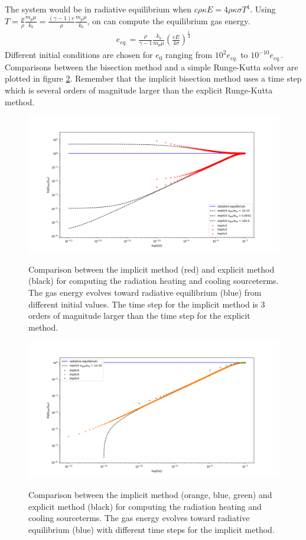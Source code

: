 The system would be in radiative equilibrium when $c \rho \kappa E = 4 \rho \kappa \sigma T^4$. Using $T =  \frac{p}{\rho} \frac{m_p \mu}{k_b}= \frac{(\gamma - 1)e}{\rho} \frac{m_p \mu}{k_b}$, on can compute the equilibrium gas energy.
\begin{align}
e_{eq.} = \frac{\rho}{\gamma - 1} \frac{k_b}{m_p \mu}\left( \frac{c E}{4 \sigma} \right)^\frac{1}{4}
\end{align}
Different initial conditions are chosen for $e_0$ ranging from $10^2 e_{eq.}$ to $10^{-10} e_{eq.}$. Comparisons between the bisection method and a simple Runge-Kutta solver are plotted in figure \ref{fig: test_sourceterms}. Remember that the implicit bisection method uses a time step which is several orders of magnitude larger than the explicit Runge-Kutta method.

\begin{figure}
\includegraphics[width = \textwidth]{test_sourceterms.png}
\label{fig: test_sourceterms}
\caption{Comparison between the implicit method (red) and explicit method (black) for computing the radiation heating and cooling sourceterms. The gas energy evolves toward radiative equilibrium (blue) from different initial values. The time step for the implicit method is 3 orders of magnitude larger than the time step for the explicit method.}
\end{figure}

\begin{figure}
\includegraphics[width = \textwidth]{test_sourceterms_dt.png}
\label{fig: test_sourceterms}
\caption{Comparison between the implicit method (orange, blue, green) and explicit method (black) for computing the radiation heating and cooling sourceterms. The gas energy evolves toward radiative equilibrium (blue) with different time steps for the implicit method.}
\end{figure}

